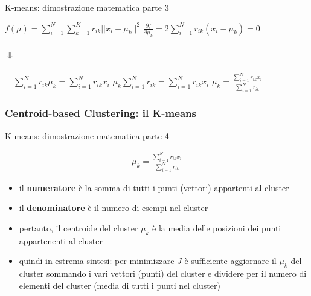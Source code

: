 {\begin{frame}
\begin{block}{K-means: dimostrazione matematica parte 3}
			\begin{center}
				$f(\mu) = \sum^{N}_{i=1} \sum_{k=1}^{K} r_{ik} ||x_i - \mu_k||^2$ \newlinedouble %
				$\frac{\partial f}{\partial \mu_k} = 2 \sum_{i=1}^{N} r_{ik}(x_i - \mu_k) = 0$  \\~\\ $\pmb{\Downarrow}$ \\~\\
				$\quad \sum_{i=1}^{N} r_{ik}\mu_{k} = \sum_{i=1}^{N} r_{ik}x_{i}$ \newlinedouble %
				$\mu_k \sum_{i=1}^{N} r_{ik} = \sum_{i=1}^{N} r_{ik} x_i$ \newlinedouble %
				$\mu_k = \frac{\sum_{i=1}^{N} r_{ik} x_i}{\sum_{i=1}^{N} r_{ik}}$	
			\end{center}
	
		\end{block}
	
	\end{frame}
	
	
	\begin{frame}
	
		\frametitle{{\color{GradientDescentDiagramBlue}Centroid-based Clustering}: il K-means}
	
		\begin{block}{K-means: dimostrazione matematica parte 4}
	
				\begin{gather*}
					 \mu_k = \frac{\sum_{i=1}^{N} r_{ik} x_i}{\sum_{i=1}^{N} r_{ik}}
				\end{gather*}
	
			\begin{itemize}
				\item il \textbf{numeratore} è la somma di tutti i  punti (vettori) appartenti al cluster
				\item il \textbf{denominatore} è il numero di esempi nel cluster
				\item pertanto, il centroide del cluster $\mu_k$ è la media delle posizioni dei punti appartenenti al cluster
				\item quindi in estrema sintesi: per minimizzare $J$ è sufficiente aggiornare il $\mu_k$ del cluster sommando i vari vettori (punti) del cluster e dividere per il numero di elementi del cluster (media di tutti i punti nel cluster)
			\end{itemize}
	
		\end{block}
	
	\end{frame}
}


